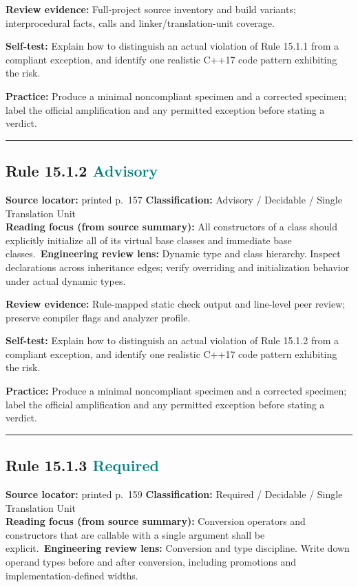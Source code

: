\documentclass[10pt,letterpaper]{article}
\begin{document}
\textbf{Review evidence:} Full-project source inventory and build variants; interprocedural facts, calls and linker/translation-unit coverage.

\textbf{Self-test:} Explain how to distinguish an actual violation of Rule 15.1.1 from a compliant exception, and identify one realistic C++17 code pattern exhibiting the risk.\par
\textbf{Practice:} Produce a minimal noncompliant specimen and a corrected specimen; label the official amplification and any permitted exception before stating a verdict.
\smallskip\hrule\smallskip
\subsection*{Rule 15.1.2 \enspace \texorpdfstring{\small\textcolor{teal}{Advisory}}{Advisory}}
\noindent\textbf{Source locator:} printed p.~157 \quad\textbf{Classification:} Advisory / Decidable / Single Translation Unit\\
\textbf{Reading focus (from source summary):} All constructors of a class should explicitly initialize all of its virtual base classes and immediate base classes.\
\textbf{Engineering review lens:} Dynamic type and class hierarchy. Inspect declarations across inheritance edges; verify overriding and initialization behavior under actual dynamic types.

\textbf{Review evidence:} Rule-mapped static check output and line-level peer review; preserve compiler flags and analyzer profile.

\textbf{Self-test:} Explain how to distinguish an actual violation of Rule 15.1.2 from a compliant exception, and identify one realistic C++17 code pattern exhibiting the risk.\par
\textbf{Practice:} Produce a minimal noncompliant specimen and a corrected specimen; label the official amplification and any permitted exception before stating a verdict.
\smallskip\hrule\smallskip
\subsection*{Rule 15.1.3 \enspace \texorpdfstring{\small\textcolor{teal}{Required}}{Required}}
\noindent\textbf{Source locator:} printed p.~159 \quad\textbf{Classification:} Required / Decidable / Single Translation Unit\\
\textbf{Reading focus (from source summary):} Conversion operators and constructors that are callable with a single argument shall be explicit.\
\textbf{Engineering review lens:} Conversion and type discipline. Write down operand types before and after conversion, including promotions and implementation-defined widths.
\end{document}
